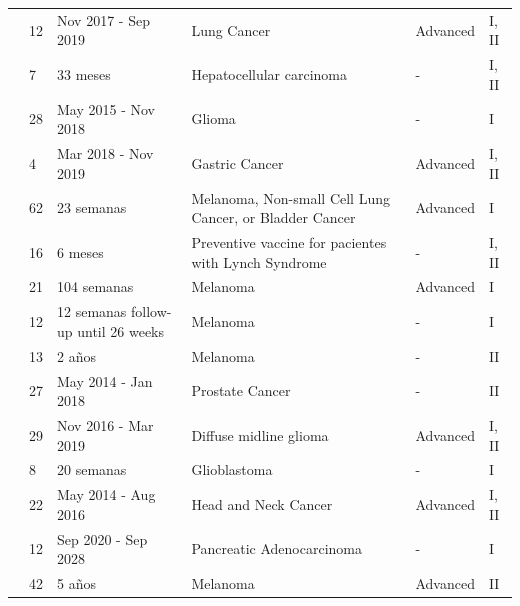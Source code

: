 \begin{table}[h]
{{\begin{tabular}{p{2.8cm}p{0.5cm}p{2.3cm}p{4.5cm}p{1.5cm}p{0.5cm}}
				\cite{cheng2021bertmhc} & 12  & Nov 2017 - Sep 2019 & Lung Cancer & Advanced & I, II \\
				
				\cite{cai2021personalized} & 7  & 33 meses & Hepatocellular carcinoma & -& I, II \\
				
				\cite{platten2021vaccine} & 28  & May 2015 - Nov 2018 & Glioma & -& I \\
				
				
				\cite{cafri2020mrna} & 4  & Mar 2018 - Nov 2019 & Gastric Cancer & Advanced & I, II \\
				
				
				
				
				
				
				\cite{ott2020phase} & 62  & 23 semanas & Melanoma, Non-small Cell Lung Cancer, or Bladder Cancer & Advanced & I \\
				
				
				\cite{kloor2020frameshift} & 16  & 6 meses & Preventive vaccine for pacientes with Lynch Syndrome  &- & I, II \\
				
				
				
				\cite{poran2020combined} & 21  & 104 semanas & Melanoma & Advanced & I \\
				
				\cite{engelhard2020mhc} & 12  & 12 semanas follow-up until 26 weeks & Melanoma &- & I \\
				
				\cite{podaza2020evaluation} & 13  & 2 años & Melanoma & -& II \\
				
				\cite{sater2020neoadjuvant} & 27  & May 2014 - Jan 2018 & Prostate Cancer & -& II \\ 
				
				\cite{mueller2022mass} & 29  & Nov 2016 - Mar 2019 & Diffuse midline glioma & Advanced & I, II \\
				
				\cite{keskin2019neoantigen} & 8  & 20 semanas & Glioblastoma & -& I \\
				
				
				\cite{aggarwal2019immunotherapy} & 22  & May 2014 - Aug 2016 & Head and Neck Cancer & Advanced & I, II \\
				
				
				
				
				
				\cite{bassani2019phase} & 12  & Sep 2020 - Sep 2028 & Pancreatic Adenocarcinoma &- & I \\
				
				
				
				
				
				\cite{dillman2018randomized} & 42  & 5 años & Melanoma & Advanced & II \\
			\end{tabular}
		}
	}
\end{table}
